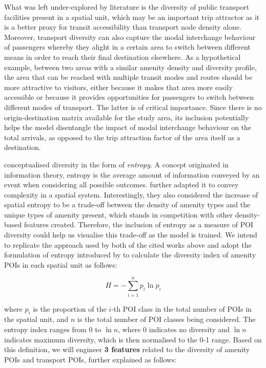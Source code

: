 What was left under-explored by literature is the diversity of public transport facilities present in a spatial unit, which may be an important trip attractor as it is a better proxy for transit accessibility than transport node density alone. Moreover, transport diversity can also capture the modal interchange behaviour of passengers whereby they alight in a certain area to switch between different means in order to reach their final destination elsewhere. As a hypothetical example, between two areas with a similar amenity density and diversity profile, the area that can be reached with multiple transit modes and routes should be more attractive to visitors, either because it makes that area more easily accessible or because it provides opportunities for passengers to switch between different modes of transport. The latter is of critical importance. Since there is no origin-destination matrix available for the study area, its inclusion potentially helps the model disentangle the impact of modal interchange behaviour on the total arrivals, as opposed to the trip attraction factor of the area itself as a destination.

\citet{cerveroTravelDemand3Ds1997} conceptualised diversity in the form of \textit{entropy}. A concept originated in information theory, entropy is the average amount of information conveyed by an event when considering all possible outcomes. \citet{battyEntropyComplexitySpatial2014} further adapted it to convey complexity in a spatial system. Interestingly, they also considered the increase of spatial entropy to be a trade-off between the density of amenity types and the unique types of amenity present, which stands in competition with other density-based features created. Therefore, the inclusion of entropy as a measure of POI diversity could help us visualise this trade-off as the model is trained. We intend to replicate the approach used by both of the cited works above and adopt the formulation of entropy introduced by \citet{shannonMathematicalTheoryCommunication1948} to calculate the diversity index of amenity POIs in each spatial unit as follows:

\begin{equation}
    H = -\sum_{i=1}^{n} p_i \ln p_i
\end{equation}

where $p_i$ is the proportion of the $i$-th POI class in the total number of POIs in the spatial unit, and $n$ is the total number of POI classes being considered. The entropy index ranges from 0 to $\ln n$, where 0 indicates no diversity and $\ln n$ indicates maximum diversity, which is then normalised to the 0-1 range. Based on this definition, we will engineer \textbf{3 features} related to the diversity of amenity POIs and transport POIs, further explained as follows:

